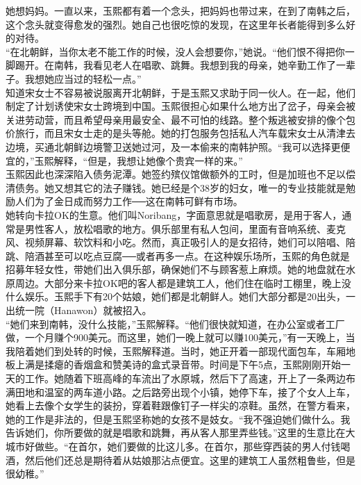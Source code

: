 她想妈妈。一直以来，玉熙都有着一个念头，把妈妈也带过来，在到了南韩之后，这个念头就变得愈发的强烈。她自己也很吃惊的发现，在这里年长者能得到多么好的对待。\\

“在北朝鲜，当你太老不能工作的时候，没人会想要你，”她说。“他们恨不得把你一脚踢开。在南韩，我看见老人在唱歌、跳舞。我想到我的母亲，她辛勤工作了一辈子。我想她应当过的轻松一点。”\\

知道宋女士不容易被说服离开北朝鲜，于是玉熙又求助于同一伙人。在一起，他们制定了计划诱使宋女士跨境到中国。玉熙很担心如果什么地方出了岔子，母亲会被关进劳动营，而且希望母亲用最安全、最不可怕的线路。整个叛逃被安排的像个包价旅行，而且宋女士走的是头等舱。她的打包服务包括私人汽车载宋女士从清津去边境，买通北朝鲜边境警卫送她过河，及一本偷来的南韩护照。“我可以选择更便宜的，”玉熙解释，“但是，我想让她像个贵宾一样的来。”\\

玉熙因此也深深陷入债务泥潭。她签约殡仪馆做额外的工时，但是加班也不足以偿清债务。她又想其它的法子赚钱。她已经是个38岁的妇女，唯一的专业技能就是勉励人们为了金日成而努力工作──这在南韩可鲜有市场。\\

她转向卡拉OK的生意。他们叫Noribang，字面意思就是唱歌房，是用于客人，通常是男性客人，放松唱歌的地方。俱乐部里有私人包间，里面有音响系统、麦克风、视频屏幕、软饮料和小吃。然而，真正吸引人的是女招待，她们可以陪唱、陪跳、陪酒甚至可以吃点豆腐──或者再多一点。在这种娱乐场所，玉熙的角色就是招募年轻女性，带她们出入俱乐部，确保她们不与顾客惹上麻烦。她的地盘就在水原周边。大部分来卡拉OK吧的客人都是建筑工人，他们住在临时工棚里，晚上没什么娱乐。玉熙手下有20个姑娘，她们都是北朝鲜人。她们大部分都是20出头，一出统一院（Hanawon）就被招入。\\

“她们来到南韩，没什么技能，”玉熙解释。“他们很快就知道，在办公室或者工厂做，一个月赚个900美元。而这里，她们一晚上就可以赚100美元，”有一天晚上，当我陪着她们到处转的时候，玉熙解释道。当时，她正开着一部现代面包车，车厢地板上满是揉瘪的香烟盒和赞美诗的盒式录音带。时间是下午5点，玉熙刚刚开始一天的工作。她随着下班高峰的车流出了水原城，然后下了高速，开上了一条两边布满田地和温室的两车道小路。之后路旁出现个小镇，她停下车，接了个女人上车，她看上去像个女学生的装扮，穿着鞋跟像钉子一样尖的凉鞋。虽然，在警方看来，她的工作是非法的，但是玉熙坚称她的女孩不是妓女。“我不强迫她们做什么。我告诉她们，你所要做的就是唱歌和跳舞，再从客人那里弄些钱。”这里的生意比在大城市好做些。“在首尔，她们要做的比这儿多。在首尔，那些穿西装的男人付钱喝酒，然后他们还总是期待着从姑娘那沾点便宜。这里的建筑工人虽然粗鲁些，但是很幼稚。”\\


